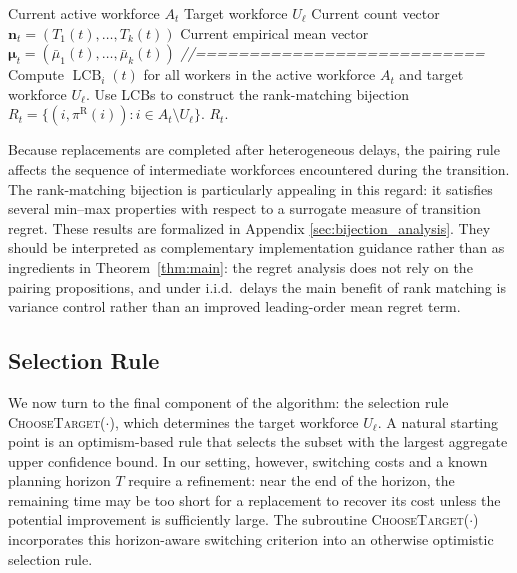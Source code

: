 \documentclass[opre,blindrev]{informs3}
\newcommand{\LCB}{\operatorname{LCB}}
\newcommand{\ChooseTarget}{\textsc{ChooseTarget}}
\begin{document}
\begin{algorithm}
    \caption{ConstructBijection}
    \label{alg:ConstructBijection}
    \begin{algorithmic}[1]
        \Require Current active workforce \(A_t\)
        \Require Target workforce \(U_{\ell}\)
        \Require Current count vector \(\mathbf{n}_t=(T_1(t),\dots,T_k(t))\)
        \Require Current empirical mean vector \(\boldsymbol{\mu}_t=(\bar{\mu}_1(t),\dots,\bar{\mu}_k(t))\)
        \Statex \textit{//===========================}
        \State Compute \(\LCB_i(t)\) for all workers in the active workforce \(A_t\) and target workforce \(U_{\ell}\).
        \State Use LCBs to construct the rank-matching bijection \(R_t = \{  (i,\pi^{\mathrm{R}}(i)) : i \in  A_{t}\setminus U_{\ell}  \}\).
        \State \Return  \(R_t\).
    \end{algorithmic}
\end{algorithm}
Because replacements are completed after heterogeneous delays, the pairing rule affects the sequence of intermediate workforces encountered during the transition. The rank-matching bijection is particularly appealing in this regard: it satisfies several min--max properties with respect to a surrogate measure of transition regret. These results are formalized in Appendix \ref{sec:bijection_analysis}. They should be interpreted as complementary implementation guidance rather than as ingredients in Theorem~\ref{thm:main}: the regret analysis does not rely on the pairing propositions, and under i.i.d.\ delays the main benefit of rank matching is variance control rather than an improved leading-order mean regret term.

\subsection{Selection Rule}
We now turn to the final component of the algorithm: the selection rule \ChooseTarget(\(\cdot\)), which determines the target workforce \(U_\ell\). A natural starting point is an optimism-based rule that selects the subset with the largest aggregate upper confidence bound. In our setting, however, switching costs and a known planning horizon \(T\) require a refinement: near the end of the horizon, the remaining time may be too short for a replacement to recover its cost unless the potential improvement is sufficiently large. The subroutine \ChooseTarget(\(\cdot\)) incorporates this horizon-aware switching criterion into an otherwise optimistic selection rule.
\end{document}
